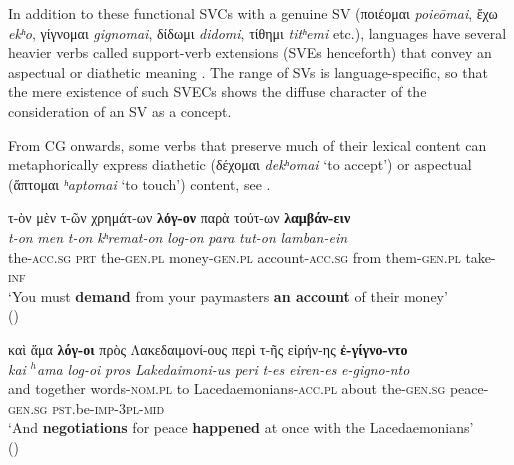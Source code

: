 \documentclass[output=paper,colorlinks,citecolor=brown]{langscibook}
\begin{document}
In addition to these functional SVCs with a genuine SV (ποιέομαι \emph{poieōmai}, ἔχω
\emph{ekʰo}, γίγνομαι \emph{gignomai}, δίδωμι \emph{didomi}, τίθημι
\emph{titʰemi} etc.), languages have several heavier verbs called
support-verb extensions (SVEs henceforth) that convey an aspectual or diathetic meaning
\parencites{VivesRobert-198467,GrossGaston-1989673,BanosJoséMiguel-2014280,BanosJoséMiguelandMaríaDoloresJiménezLópez-2018477}.
The range of SVs is language-specific, so that the mere existence of such SVECs shows the
diffuse character of the consideration of an SV as a concept.

From CG onwards, some verbs that preserve much of their lexical content can metaphorically
express diathetic (δέχομαι \emph{dekʰomai} `to accept') or aspectual
(ἅπτομαι \emph{ʰaptomai} `to touch') content, see .


\ea\label{ex:vc:3}

\ea\label{ex:vc:3a}

\glll τ-ὸν μὲν τ-ῶν χρημάτ-ων \textbf{λόγ-ον} παρὰ τούτ-ων \textbf{λαμβάν-ειν}\\
 \textit{t-on} \textit{men} \textit{t-on} \textit{kʰremat-on} \textit{log-on} \textit{para} \textit{tut-on} \textit{lamban-ein}\\
the-\textsc{acc.sg} \textsc{prt} the-\textsc{gen.pl} money-\textsc{gen.pl} account-\textsc{acc.sg} from them-\textsc{gen.pl} take-\textsc{inf}\\
\glt `You must \textbf{demand} from your paymasters \textbf{an account} of their money' \\
\hspace*{\fill}()

\ex\label{ex:vc:3b}

\glll καὶ ἅμα \textbf{λόγ-οι} πρὸς Λακεδαιμονί-ους περὶ τ-ῆς εἰρήν-ης \textbf{ἐ-γίγνο-ντο}\\
 \textit{kai} \textit{$^h$ama} \textit{log-oi} \textit{pros} \textit{Lakedaimoni-us} \textit{peri} \textit{t-es} \textit{eiren-es} \textit{e-gigno-nto}\\
and together words-\textsc{nom.pl} to Lacedaemonians-\textsc{acc.pl} about
the-\textsc{gen.sg} peace-\textsc{gen.sg} \textsc{pst.}be\textsc{-imp-3pl-mid}\\
\glt `And \textbf{negotiations} for peace \textbf{happened} at once with the Lacedaemonians' \\
\hspace*{\fill}() \parencite[231]{JiménezLópezMaríaDolores-2021150}
\end{document}
